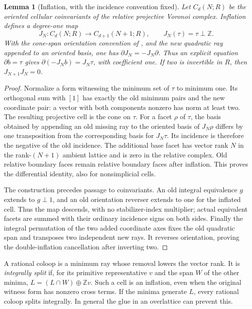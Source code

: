 \documentclass[11pt,a4paper]{article}
\newtheorem{lemma}[theorem]{Lemma}
\theoremstyle{definition}
\begin{document}
\begin{lemma}[Inflation, with the incidence convention fixed]
\label{lem:k12-inflation}
Let $C_d(N;R)$ be the oriented cellular coinvariants of the relative
projective Voronoi complex. Inflation defines a degree-one map
\[
 J_N:C_d(N;R)\longrightarrow C_{d+1}(N+1;R),\qquad
 J_N(\tau)=\tau\perp\mathbb Z.
\]
With the cone-span orientation convention of
\cite[\S1.2.1, equations (1)--(2)]{DEKM2026}, and the new quadratic
ray appended to an oriented basis, one has
$\partial J_N=-J_N\partial$. Thus an explicit equation
$\partial b=\tau$ gives $\partial(-J_Nb)=J_N\tau$, with coefficient
one. If two is invertible in $R$, then $J_{N+1}J_N=0$.
\end{lemma}

\begin{proof}
Normalize a form witnessing the minimum set of $\tau$ to minimum one.
Its orthogonal sum with $[1]$ has exactly the old minimum pairs and the
new coordinate pair: a vector with both components nonzero has norm
at least two. The resulting projective cell is the cone on $\tau$.
For a facet $\rho$ of $\tau$, the basis obtained by appending an old
missing ray to the oriented basis of $J_N\rho$ differs by one
transposition from the corresponding basis for $J_N\tau$.
Its incidence is therefore the negative of the old incidence.
The additional base facet has vector rank $N$ in the rank-$(N+1)$
ambient lattice and is zero in the relative complex. Old relative
boundary faces remain relative boundary faces after inflation.
This proves the differential identity, also for nonsimplicial cells.

The construction precedes passage to coinvariants. An old integral
equivalence $g$ extends to $g\perp1$, and an old orientation reverser
extends to one for the inflated cell. Thus the map descends, with no
stabilizer-index multiplier; actual equivalent facets are summed with
their ordinary incidence signs on both sides. Finally the integral
permutation of the two added coordinate axes fixes the old quadratic
span and transposes two independent new rays. It reverses orientation,
proving the double-inflation cancellation after inverting two.
\end{proof}

A rational coloop is a minimum ray whose removal lowers the vector
rank. It is \emph{integrally split} if, for its primitive representative
$v$ and the span $W$ of the other minima,
$L=(L\cap W)\oplus\mathbb Zv$. Such a cell is an inflation, even when
the original witness form has nonzero cross terms. If the minima
generate $L$, every rational coloop splits integrally. In general the
glue in an overlattice can prevent this.
\end{document}
